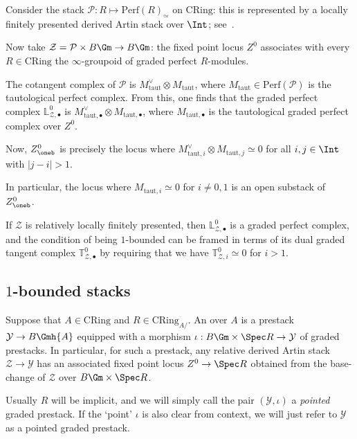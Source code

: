 \documentclass[10pt]{amsart}
\begin{document}
\begin{example}
\label{ex:perfect_complexes_HTwts_01}
Consider the stack $\mathcal{P}:R\mapsto \mathrm{Perf}(R)_{\simeq}$ on $\mathrm{CRing}$: this is represented by a locally finitely presented derived Artin stack over $\Int$; see~\cite[\S~3]{TOEN2007387}. 

Now take $\mathcal{Z} = \mathcal{P}\times B\Gm\to B\Gm$: the fixed point locus $Z^0$ associates with every $R\in  \mathrm{CRing}$ the $\infty$-groupoid of graded perfect $R$-modules.

The cotangent complex of $\mathcal{P}$ is $M_{\mathrm{taut}}^\vee\otimes M_{\mathrm{taut}}$, where $M_{\mathrm{taut}}\in \mathrm{Perf}(\mathcal{P})$ is the tautological perfect complex. From this, one finds that the graded perfect complex $\mathbb{L}^0_{\mathcal{Z},\bullet}$ is $M_{\mathrm{taut},\bullet}^\vee\otimes M_{\mathrm{taut},\bullet}$, where $M_{\mathrm{taut},\bullet}$ is the tautological graded perfect complex over $Z^0$.

Now, $Z^0_{\oneb}$ is precisely the locus where $M^\vee_{\mathrm{taut},i}\otimes M_{\mathrm{taut},j}\simeq 0$ for all $i,j\in \Int$ with $|j-i|>1$.

In particular, the locus where $M_{\mathrm{taut},i} \simeq 0$ for $i\neq 0,1$ is an open substack of $Z^0_{\oneb}$.
\end{example}  


\begin{remark}
If $\mathcal{Z}$ is relatively locally finitely presented, then $\mathbb{L}^0_{\mathcal{Z},\bullet}$ is a graded perfect complex, and the condition of being $1$-bounded can be framed in terms of its dual graded tangent complex $\mathbb{T}^0_{\mathcal{Z},\bullet}$ by requiring that we have $\mathbb{T}^0_{\mathcal{Z},i}\simeq 0$ for $i>1$.
\end{remark}   



\subsection{$1$-bounded stacks}
\label{subsec:1_bounded_stacks}


\begin{definition}
\label{defn:pointed_graded}
Suppose that $A\in \mathrm{CRing}$ and $R\in \mathrm{CRing}_{A/}$. An  over $A$ is a prestack $\mathcal{Y}\to B\Gmh{A}$ equipped with a morphism $\iota:B\Gm\times\Spec R\to \mathcal{Y}$ of graded prestacks. In particular, for such a prestack, any relative derived Artin stack $\mathcal{Z}\to \mathcal{Y}$ has an associated fixed point locus $Z^0\to \Spec R$ obtained from the base-change of $\mathcal{Z}$ over $B\Gm\times\Spec R$.

Usually $R$ will be implicit, and we will simply call the pair $(\mathcal{Y},\iota)$ a \emph{pointed} graded prestack. If the `point' $\iota$ is also clear from context, we will just refer to $\mathcal{Y}$ as a pointed graded prestack.
\end{definition}
\end{document}
